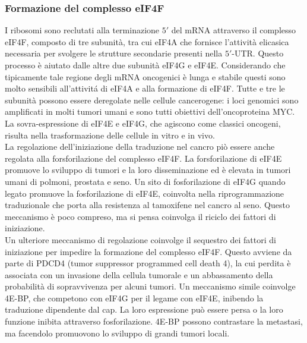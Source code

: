 		\subsubsection{Formazione del complesso eIF4F}
		I ribosomi sono reclutati alla terminazione $5'$ del mRNA attraverso il complesso eIF4F, composto di tre subunit\`a, tra cui eIF4A che fornisce l'attivit\`a elicasica necessaria per svolgere le strutture secondarie presenti nella $5'$-UTR.
		Questo processo \`e aiutato dalle altre due subunit\`a eIF4G e eIF4E.
		Considerando che tipicamente tale regione degli mRNA oncogenici \`e lunga e stabile questi sono molto sensibili all'attivit\'a di eIF4A e alla formazione di eIF4F.
		Tutte e tre le subunit\`a possono essere deregolate nelle cellule cancerogene: i loci genomici sono amplificati in molti tumori umani e sono tutti obiettivi dell'oncoproteina MYC.
		La sovra-espressione di eIF4E e eIF4G, che agiscono come classici oncogeni, risulta nella trasformazione delle cellule in vitro e in vivo.\\
		La regolazione dell'iniziazione della traduzione nel cancro pi\`o essere anche regolata alla forsforilazione del complesso eIF4F.
		La forsforilazione di eIF4E promuove lo sviluppo di tumori e la loro disseminazione ed \`e elevata in tumori umani di polmoni, prostata e seno.
		Un sito di fosforilazione di eIF4G quando legato promuove la fosforilazione di eIF4E, coinvolta nella riprogrammazione traduzionale che porta alla resistenza al tamoxifene nel cancro al seno.
		Questo meccanismo \`e poco compreso, ma si pensa coinvolga il riciclo dei fattori di iniziazione.\\
		Un ulteriore meccanismo di regolazione coinvolge il sequestro dei fattori di iniziazione per impedire la formazione del complesso eIF4F.
		Questo avviene da parte di PDCD4 (tumor suppressor programmed cell death 4), la cui perdita \`e associata con un invasione della cellula tumorale e un abbassamento della probabilit\`a di sopravvivenza per alcuni tumori.
		Un meccanismo simile coinvolge 4E-BP, che competono con eIF4G per il legame con eIF4E, inibendo la traduzione dipendente dal cap.
		La loro espressione pu\`o essere persa o la loro funzione inibita attraverso fosforilazione.
		4E-BP possono contrastare la metastasi, ma facendolo promuovono lo sviluppo di grandi tumori locali.

